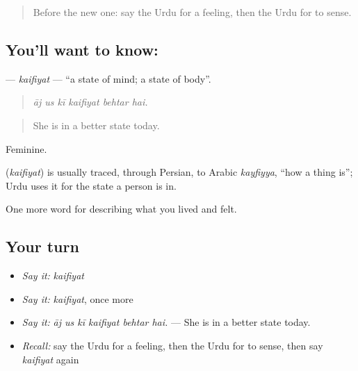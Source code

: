 \label{lesson:UR-C440-kaifiyat}



\begin{quote}
Before the new one: say the Urdu for a feeling, then the Urdu for to sense.
\end{quote}

\subsection*{You'll want to know: }
\textbf{} — \emph{kaifiyat} — \textquotedblleft{}a state of mind; a state of body\textquotedblright{}.

\begin{quote}
     
\end{quote}

\begin{quote}
\emph{āj us kī kaifiyat behtar hai.}
\end{quote}

\begin{quote}
She is in a better state today.
\end{quote}

Feminine.

\begin{cousinweb}
\textbf{} (\emph{kaifiyat}) is usually traced, through Persian, to Arabic \emph{kayfiyya}, \textquotedblleft{}how a thing is\textquotedblright{}; Urdu uses it for the state a person is in.
\end{cousinweb}

\begin{grammarlens}[title={What you've built}]
One more word for describing what you lived and felt.
\end{grammarlens}

\subsection*{Your turn}
\begin{itemize}
\raggedright
  \item \emph{Say it:} \emph{kaifiyat}
  \item \emph{Say it:} \emph{kaifiyat}, once more
  \item \emph{Say it:} \emph{āj us kī kaifiyat behtar hai.} — She is in a better state today.
  \item \emph{Recall:} say the Urdu for a feeling, then the Urdu for to sense, then say \emph{kaifiyat} again
\end{itemize}

